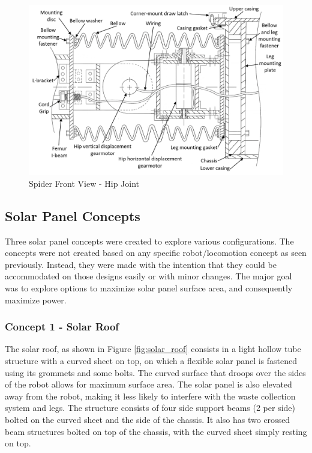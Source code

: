 \begin{figure}[H]
    \centering
    \includegraphics[width=\textwidth]{3_DesignConcepts/img/C3/hipjoint_ann.PNG}
    \caption{Spider Front View - Hip Joint}
    \label{fig:spider_hip}
\end{figure}

\subsection{Solar Panel Concepts}

Three solar panel concepts were created to explore various configurations. The concepts were not created based on any specific robot/locomotion concept as seen previously. Instead, they were made with the intention that they could be accommodated on those designs easily or with minor changes. The major goal was to explore options to maximize solar panel surface area, and consequently maximize power. 


\subsubsection{Concept 1 - Solar Roof}

The solar roof, as shown in Figure \ref{fig:solar_roof} consists in a light hollow tube structure with a curved sheet on top, on which a flexible solar panel is fastened using its grommets and some bolts. The curved surface that droops over the sides of the robot allows for maximum surface area. The solar panel is also elevated away from the robot, making it less likely to interfere with the waste collection system and legs.
The structure consists of four side support beams (2 per side) bolted on the curved sheet and the side of the chassis. It also has two crossed beam structures bolted on top of the chassis, with the curved sheet simply resting on top.

